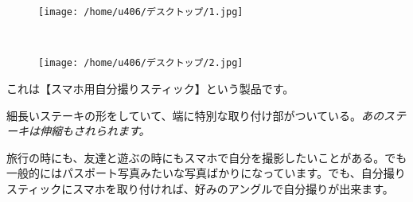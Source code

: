 \documentclass[10pt]{book}
\begin{document}
\begin{figure}[H]
        \centering
        \begin{subfloat}{}
                {\texttt{[image: /home/u406/デスクトップ/1.jpg]}}
        \end{subfloat}~
        \begin{subfloat}{}
                {\texttt{[image: /home/u406/デスクトップ/2.jpg]}}
        \end{subfloat}
\end{figure}\vspace{1in}
これは【スマホ用自分撮りスティック】という製品です。\\\newline

細長いステーキの形をしていて、端に特別な取り付け部がついている。{\it あのステーキは伸縮もされられます。}\\\newline

旅行の時にも、友達と遊ぶの時にもスマホで自分を撮影したいことがある。でも一般的にはパスポート写真みたいな写真ばかりになっています。でも、自分撮りスティックにスマホを取り付ければ、好みのアングルで自分撮りが出来ます。
\end{document}
